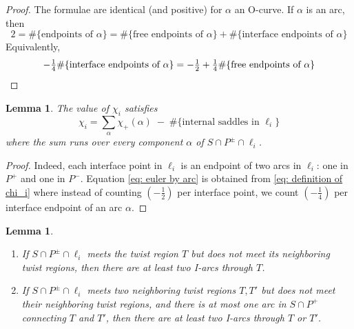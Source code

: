 \documentclass[12pt,reqno]{amsart}
\theoremstyle{plain}
\newtheorem{lemma}[theorem]{Lemma}
\theoremstyle{definition}
\begin{document}
\begin{proof}
The formulae are identical (and positive) for $\alpha$ an O-curve. 
If $\alpha$ is an arc, then
\[ 2 =\#\{\text{endpoints of }\alpha\} = \#\{\text{free endpoints of }\alpha\} + 
\#\{\text{interface endpoints of }\alpha\} \]
Equivalently, 
\[-\tfrac14 \#\{\text{interface endpoints of }\alpha\} = -\tfrac12 
+ \tfrac14\#\{\text{free endpoints of }\alpha\} \qedhere
\]
\end{proof}

\begin{lemma}\label{euler of layer is sum over arcs}
The value of $\chi_i$ satisfies
    \begin{equation}\label{eq: euler by arc}
        \chi_i = \sum_{\alpha} \chi_+(\alpha) 
        \; -\;\#\{\text{internal saddles in }\ell_i\}
    \end{equation}
    where the sum runs over every component $\alpha$ of  $S\cap P^\pm \cap \ell_i$.
\end{lemma}

\begin{proof}
Indeed, each interface point in $\ell_i$ is an endpoint of two arcs in $\ell_i$: one 
in $P^+$ and one in $P^-$. Equation \eqref{eq: euler by arc} is obtained from 
\eqref{eq: definition of chi_i} where instead of counting $(-\tfrac12)$ per 
interface point, we count $(-\tfrac14)$ per interface endpoint of an arc $\alpha$.
\end{proof}

\begin{lemma}\label{finding I arcs}\hfill
\begin{enumerate}[label=(\arabic*)]
\item\label{one twist region I-arcs} If $S \cap P^\pm \cap \ell_i$ meets the 
twist region $T$ but does not meet its neighboring twist regions, then there 
are at least two I-arcs through $T$. 
\item\label{two twist regions I-arcs} If $S \cap P^\pm \cap \ell_i$ meets two 
neighboring twist regions $T,T'$ but does not meet their neighboring twist 
regions, and there is at most one arc in $S\cap P^+$ connecting $T$ and $T'$, 
then there are at least two I-arcs through $T$ or $T'$.
\end{enumerate}
\end{lemma}
\end{document}
